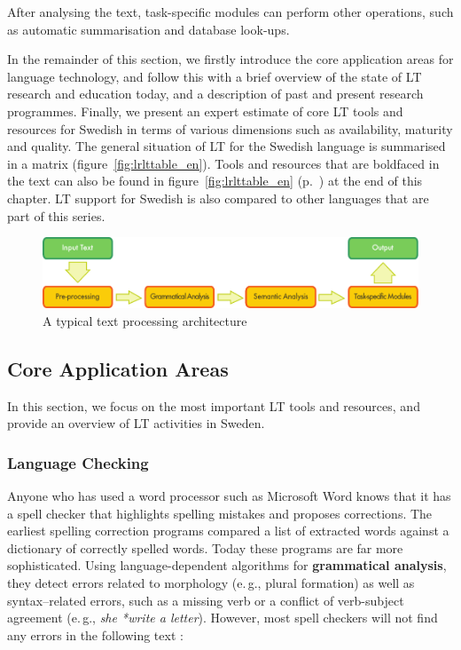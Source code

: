 \begin{multicols}{2}
After analysing the text, task-specific modules can perform other operations, such as automatic summarisation and database look-ups.

In the remainder of this section, we firstly introduce the core application areas for language technology, and follow this with a brief overview of the state of LT research and education today, and a description of past and present research programmes. Finally, we present an expert estimate of core LT tools and resources for Swedish in terms of various dimensions such as availability, maturity and quality. The general situation of LT for the Swedish language is summarised in a matrix (figure~\ref{fig:lrlttable_en}). Tools and resources that are boldfaced in the text can also be found in figure~\ref{fig:lrlttable_en} (p.~\pageref{fig:lrlttable_en}) at the end of this chapter. LT support for Swedish is also compared to other languages that are part of this series.

\begin{figure}[htb]
  \center
  \includegraphics[width=\textwidth]{../_media/english/text_processing_app_architecture}
  \caption{A typical text processing architecture}
  \label{fig:textprocessingarch_en}
\end{figure}

\subsection{Core Application Areas}

In this section, we focus on the most important LT tools and resources, and provide an overview of LT activities in Sweden. 


\subsubsection{Language Checking}

Anyone who has used a word processor such as Microsoft Word knows that
it has a spell checker that highlights spelling mistakes and proposes
corrections. The earliest spelling correction programs compared a list
of extracted words against a dictionary of correctly spelled
words. Today these programs are far more sophisticated. Using
language-dependent algorithms for \textbf{grammatical analysis}, they
detect errors related to morphology (e.\,g., plural formation) as well
as syntax–related errors, such as a missing verb or a conflict of
verb-subject agreement (e.\,g., \textit{she *write a
  letter}). However, most spell checkers will not find any errors in
the following text \cite{zar1}:


\end{multicols}
